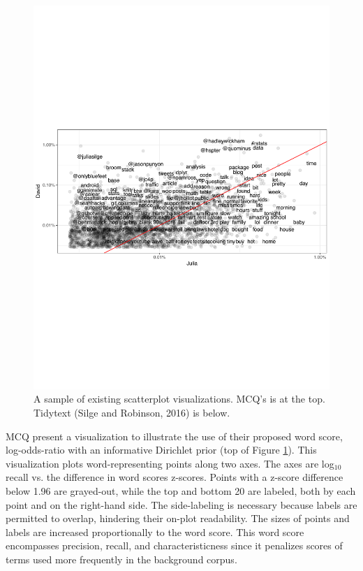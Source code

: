 \documentclass[11pt,a4paper]{article}
\begin{document}
\begin{figure}[h]
\includegraphics[width=\columnwidth]{tidytext}
\caption{A sample of existing scatterplot visualizations. MCQ's  is at the top. Tidytext (Silge and Robinson, 2016) is below.} 
\label{scatters}
\end{figure}
\vspace{-3mm}
MCQ present a visualization to illustrate the use of their proposed word score, log-odds-ratio with an informative Dirichlet prior (top of Figure \ref{scatters}).  This visualization plots word-representing points along two axes.  The axes are log$_{10}$ recall vs. the difference in word scores z-scores.  Points with a z-score difference below 1.96 are grayed-out, while the top and bottom 20 are labeled, both by each point and on the right-hand side.  The side-labeling is necessary because labels are permitted to overlap, hindering their on-plot readability.  The sizes of points and labels are increased proportionally to the word score. This word score encompasses precision, recall, and characteristicness since it penalizes scores of terms used more frequently in the background corpus. 
\end{document}
